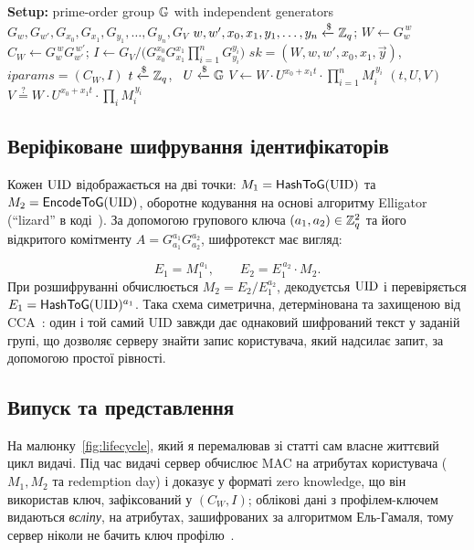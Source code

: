 \begin{algorithm}[!ht]
  \small
  \caption{Алгебраїчний MAC типу CPZ над елементами групи~\cite[\S 3.1]{CPZ20}}
  \label{alg:cpzmac}
  \begin{algorithmic}[1]
    \Statex \textbf{Setup:} prime-order group $\mathbb{G}$ with independent generators $G_w,G_{w'},G_{x_0},G_{x_1},G_{y_1},
      \dots,G_{y_n},G_V$
    \State $w,w',x_0,x_1,y_1,\dots,y_n \xleftarrow{\$} \mathbb{Z}_q$; \quad $W \gets G_w^{\,w}$
    \State $C_W \gets G_w^{\,w}G_{w'}^{\,w'}$; \quad
    $I \gets G_V \big/ \bigl(G_{x_0}^{x_0}G_{x_1}^{x_1}\prod_{i=1}^{n} G_{y_i}^{y_i}\bigr)$
    \State \Return $\mathit{sk}=(W,w,w',x_0,x_1,\vec y)$, \ $\mathit{iparams}=(C_W,I)$
    \EndProcedure
    \State $t \xleftarrow{\$} \mathbb{Z}_q$, \ $U \xleftarrow{\$} \mathbb{G}$
    \State $V \gets W\cdot U^{x_0+x_1 t}\cdot\prod_{i=1}^{n} M_i^{\,y_i}$
    \State \Return $(t,U,V)$
    \EndProcedure
    \State \Return $V \overset{?}{=} W\cdot U^{x_0+x_1 t}\cdot\prod_{i} M_i^{\,y_i}$
    \EndProcedure
  \end{algorithmic}
\end{algorithm}

\subsection{Веріфіковане шифрування ідентифікаторів}

Кожен $\mathrm{UID}$ відображається на дві точки: $M_1=\mathsf{HashToG}(\mathrm{UID})$ та $M_2=\mathsf{EncodeToG}(\mathrm{UID})$, оборотне 
кодування на основі алгоритму Elligator (\enquote{lizard} в коді~\cite{libsignal}). За допомогою групового ключа 
$(a_1,a_2) \in \mathbb{Z}_q^2$ та його відкритого комітменту $A = G_{a_1}^{a_1}G_{a_2}^{a_2}$, шифротекст має вигляд:

\begin{equation}
  E_1 = M_1^{\,a_1}, \qquad E_2 = E_1^{\,a_2}\cdot M_2 .
  \label{eq:enc}
\end{equation}
При розшифруванні обчислюється $M_2 = E_2/E_1^{a_2}$, декодуєтсья $\mathrm{UID}$ і перевіряється \\ 
$E_1 = \mathsf{HashToG}(\mathrm{UID})^{a_1}$. Така схема симетрична, детермінована та захищеною від CCA~\cite{CPZ20}: 
один і той самий UID завжди дає однаковий шифрований текст у заданій групі, що дозволяє серверу знайти запис 
користувача, який надсилає запит, за допомогою простої рівності.

\subsection{Випуск та представлення}
\label{sec:show}
На малюнку~\ref{fig:lifecycle}, який я перемалював зі статті сам власне життєвий цикл видачі. Під час видачі 
сервер обчислює MAC на атрибутах користувача ($M_1, M_2$ та redemption day) і доказує у форматі zero knowledge, 
що він використав ключ, зафіксований у $(C_W,I)$; облікові дані з профілем-ключем видаються \emph{всліпу}, на 
атрибутах, зашифрованих за алгоритмом Ель-Гамаля, тому сервер ніколи не бачить ключ профілю~\cite{CPZ20}.

